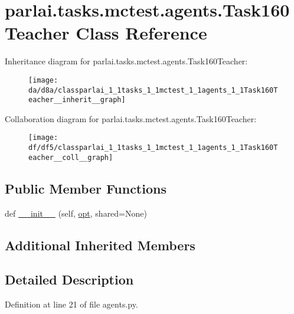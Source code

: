 \hypertarget{classparlai_1_1tasks_1_1mctest_1_1agents_1_1Task160Teacher}{}\section{parlai.\+tasks.\+mctest.\+agents.\+Task160\+Teacher Class Reference}
\label{classparlai_1_1tasks_1_1mctest_1_1agents_1_1Task160Teacher}


Inheritance diagram for parlai.\+tasks.\+mctest.\+agents.\+Task160\+Teacher\+:\nopagebreak
\begin{figure}[H]
\begin{center}
\leavevmode
\texttt{[image: da/d8a/classparlai\_1\_1tasks\_1\_1mctest\_1\_1agents\_1\_1Task160Teacher\_\_inherit\_\_graph]}
\end{center}
\end{figure}


Collaboration diagram for parlai.\+tasks.\+mctest.\+agents.\+Task160\+Teacher\+:\nopagebreak
\begin{figure}[H]
\begin{center}
\leavevmode
\texttt{[image: df/df5/classparlai\_1\_1tasks\_1\_1mctest\_1\_1agents\_1\_1Task160Teacher\_\_coll\_\_graph]}
\end{center}
\end{figure}
\subsection*{Public Member Functions}
\begin{DoxyCompactItemize}
\item 
def \hyperlink{classparlai_1_1tasks_1_1mctest_1_1agents_1_1Task160Teacher_ada45ef335bc03d8fa3a410b4e9b6b282}{\+\_\+\+\_\+init\+\_\+\+\_\+} (self, \hyperlink{classparlai_1_1core_1_1teachers_1_1FbDialogTeacher_af7a9ec497b9cd0292d7b8fa220da7c28}{opt}, shared=None)
\end{DoxyCompactItemize}
\subsection*{Additional Inherited Members}


\subsection{Detailed Description}


Definition at line 21 of file agents.\+py.



